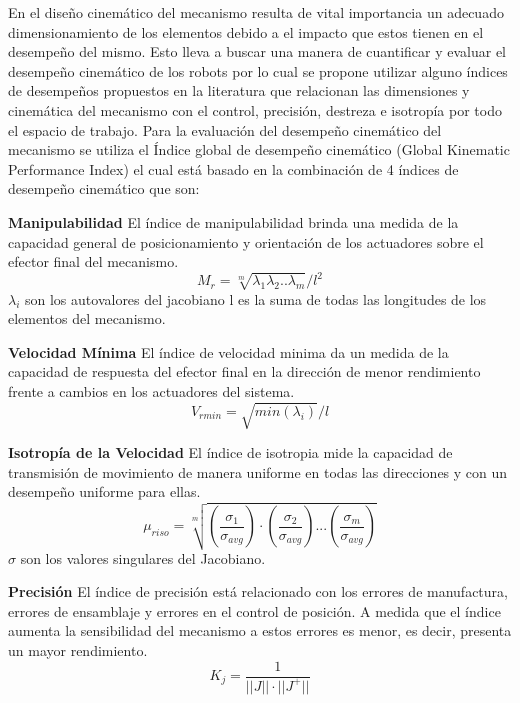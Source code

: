 En el diseño cinemático del mecanismo resulta de vital importancia un adecuado dimensionamiento de los elementos debido a el impacto que estos tienen en el desempeño del mismo. Esto lleva a buscar una manera de cuantificar y evaluar el desempeño cinemático de los robots por lo cual se propone utilizar alguno índices de desempeños propuestos en la literatura que relacionan las dimensiones y cinemática del mecanismo con el control, precisión, destreza e isotropía por todo el espacio de trabajo. 
Para la evaluación del desempeño cinemático del mecanismo se utiliza el Índice global de desempeño cinemático (Global Kinematic Performance Index) el cual está basado en la combinación de 4 índices de desempeño cinemático que son:

\textbf{Manipulabilidad}\newline
El índice de manipulabilidad brinda una medida de la capacidad general de posicionamiento y orientación de los actuadores sobre el efector final del mecanismo.
\begin{equation}
    M_{r}= \sqrt[m]{\lambda_1\lambda_2 ..\lambda_m}/l^2 
\end{equation}
$\lambda_i$ son los autovalores del jacobiano\newline
l es la suma de todas las longitudes de los elementos del mecanismo.\newline


\textbf{Velocidad Mínima}\newline
El índice de velocidad minima da un medida de la capacidad de respuesta del efector final en la dirección de menor rendimiento frente a cambios en los actuadores del sistema.
\begin{equation}
    V_{rmin}= \sqrt{min(\lambda_i)}/l
\end{equation}

\textbf{Isotropía de la Velocidad}\newline
El índice de isotropia mide la capacidad de transmisión de movimiento de manera uniforme en todas las direcciones y con un desempeño uniforme para ellas.
\begin{equation}
    \mu_{riso}= \sqrt[m]{\left(\frac{\sigma_1}{\sigma_{avg}}\right)\cdot\left(\frac{\sigma_2}{\sigma_{avg}}\right)...\left(\frac{\sigma_m}{\sigma_{avg}}\right)}
\end{equation}
$\sigma$ son los valores singulares del Jacobiano.\newline


\textbf{Precisión}\newline{}
El índice de precisión está relacionado con los errores de manufactura, errores de ensamblaje y errores en el control de posición. A medida que el índice aumenta la sensibilidad del mecanismo a estos errores es menor, es decir, presenta un mayor rendimiento.
\begin{equation}
    K_j = \frac{1}{||J||\cdot||J^+||}
\end{equation}

